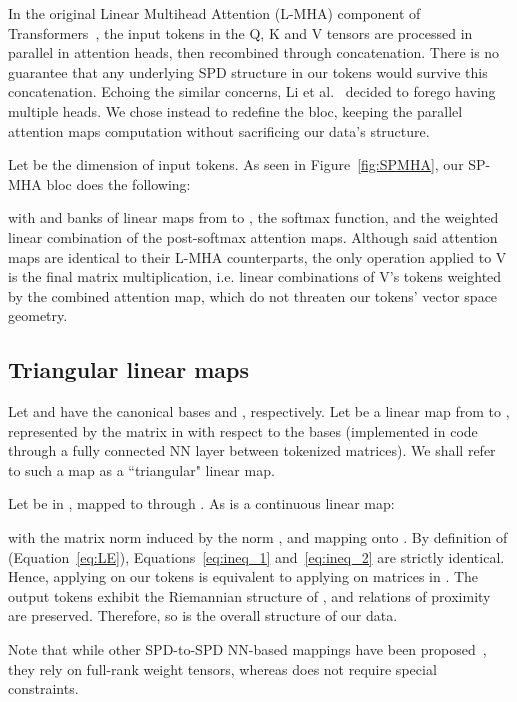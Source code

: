 \documentclass{article}
\begin{document}
In the original Linear Multihead Attention (L-MHA) component of Transformers~\cite{transformers}, the input tokens in the Q, K and V tensors are processed in parallel in  attention heads, then recombined through concatenation.
There is no guarantee that any underlying SPD structure in our tokens would survive this concatenation. Echoing the similar concerns, Li et al.~\cite{li2022geodesic} decided to forego having multiple heads. We chose instead to redefine the bloc, keeping the parallel attention maps computation without sacrificing our data's structure.

Let  be the dimension of input tokens.
As seen in Figure~\ref{fig:SPMHA}, our SP-MHA bloc does the following:

with  and  banks of  linear maps from  to ,  the softmax function, and  the weighted linear combination of the  post-softmax attention maps.
Although said attention maps are identical to their L-MHA counterparts, the only operation applied to V is the final matrix multiplication, i.e. linear combinations of V's tokens weighted by the combined attention map, which do not threaten our tokens' vector space geometry.

\subsection{Triangular linear maps}
\label{ssec:justification}

Let  and  have the canonical bases  and , respectively. Let  be a linear map from  to , represented by the matrix  in  with respect to the bases (implemented in code through a fully connected NN layer between tokenized matrices). We shall refer to such a map as a ``triangular" linear map.

Let  be in , mapped to  through . As  is a continuous linear map:


with  the matrix norm induced by the norm , and  mapping  onto .
By definition of  (Equation~\ref{eq:LE}), Equations~\ref{eq:ineq_1} and~\ref{eq:ineq_2} are strictly identical.
Hence, applying  on our tokens is equivalent to applying  on matrices in . The output tokens exhibit the Riemannian structure of , and relations of proximity are preserved. Therefore, so is the overall structure of our data.

Note that while other SPD-to-SPD NN-based mappings have been proposed~\cite{SPD_dim_reduc,huang2017spdnet}, they rely on full-rank weight tensors, whereas  does not require special constraints.
\end{document}
